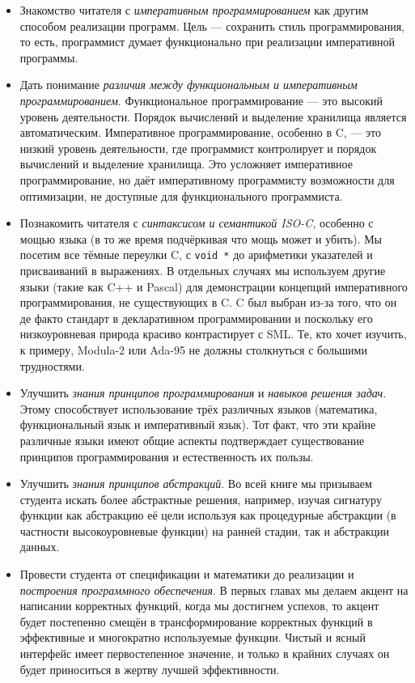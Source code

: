 \begin{itemize}
\item{Знакомство читателя с \emph{императивным программированием} как другим способом реализации программ. Цель --- сохранить стиль программирования, то есть, программист думает функционально при реализации императивной программы.}

\item{Дать понимание \emph{различия между функциональным и императивным программированием}. Функциональное программирование --- это высокий уровень деятельности. Порядок вычислений и выделение хранилища является автоматическим. Императивное программирование, особенно в C, --- это низкий уровень деятельности, где программист контролирует и порядок вычислений и выделение хранилища. Это усложняет императивное программирование, но даёт императивному программисту возможности для оптимизации, не доступные для функционального программиста.}

\item{Познакомить читателя с \emph{синтаксисом и семантикой ISO-C}, особенно с мощью языка (в то же время подчёркивая что мощь может и убить). Мы посетим все тёмные переулки C, с \lstinline|void *| до арифметики указателей и присваиваний в выражениях. В отдельных случаях мы используем другие языки (такие как C++ и Pascal) для демонстрации концепций императивного программирования, не существующих в C. C был выбран из-за того, что он де факто стандарт в декларативном программировании и поскольку его низкоуровневая природа красиво контрастирует с SML. Те, кто хочет изучить, к примеру, Modula-2 или Ada-95 не должны столкнуться с большими трудностями.}

\item{Улучшить \emph{знания принципов программирования} и \emph{навыков решения задач}. Этому способствует использование трёх различных языков (математика, функциональный язык и императивный язык). Тот факт, что эти крайне различные языки имеют общие аспекты подтверждает существование принципов программирования и естественность их пользы.}

\item{Улучшить \emph{знания принципов абстракций}. Во всей книге мы призываем студента искать более абстрактные решения, например, изучая сигнатуру функции как абстракцию её цели используя как процедурные абстракции (в частности высокоуровневые функции) на ранней стадии, так и абстракции данных.}

\item{Провести студента от спецификации и математики до реализации и \emph{построения программного обеспечения}. В первых главах мы делаем акцент на написании корректных функций, когда мы достигнем успехов, то акцент будет постепенно смещён в трансформирование корректных функций в эффективные и многократно используемые функции. Чистый и ясный интерфейс имеет первостепенное значение, и только в крайних случаях он будет приноситься в жертву лучшей эффективности.}
\end{itemize}

